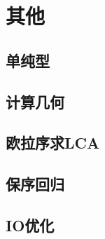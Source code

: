 \documentclass[a4paper,12pt]{article}
\begin{document}
\section{其他}

\subsection{单纯型}

\subsection{计算几何}

\subsection{欧拉序求LCA}

\subsection{保序回归}

\subsection{IO优化}



\label{LastPage}
\end{document}
